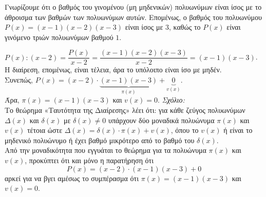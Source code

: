 \begin{alist}
\item Γνωρίζουμε ότι ο βαθμός του γινομένου (μη μηδενικών) πολυωνύμων είναι ίσος με το άθροισμα των βαθμών των πολυωνύμων αυτών. Επομένως, ο βαθμός του πολυωνύμου $P(x) = (x - 1)(x - 2)(x - 3)$ είναι ίσος με $3$, καθώς το $P(x)$ είναι γινόμενο τριών πολυωνύμων βαθμού $1$.
\item $P(x) : (x - 2) = \dfrac{P(x)}{x - 2} = \dfrac{(x - 1)(x - 2)(x - 3)}{x - 2} = (x - 1)(x - 3)$. Η διαίρεση, επομένως, είναι τέλεια, άρα το υπόλοιπο είναι ίσο με μηδέν. \\
Συνεπώς, $P(x) = (x - 2) \cdot \underbrace{(x - 1)(x - 3)}_{\pi(x)} + \underbrace{0}_{v(x)}$. \\
Άρα, $\pi(x) = (x - 1)(x - 3)$ και $v(x) = 0$.
\textit{Σχόλιο:} \\
Το θεώρημα «Ταυτότητα της Διαίρεσης» λέει ότι: για κάθε ζεύγος πολυωνύμων $\Delta(x)$ και $\delta(x)$ με $\delta(x) \neq 0$ υπάρχουν δύο μοναδικά πολυώνυμα $\pi(x)$ και $v(x)$ τέτοια ώστε $\Delta(x) = \delta(x) \cdot \pi(x) + v(x)$, όπου το $v(x)$ ή είναι το μηδενικό πολυώνυμο ή έχει βαθμό μικρότερο από το βαθμό του $\delta(x)$. \\
Από την μοναδικότητα που εγγυάται το θεώρημα για τα πολυώνυμα $\pi(x)$ και $v(x)$, προκύπτει ότι και μόνο η παρατήρηση ότι
\[P(x) = (x - 2) \cdot (x - 1)(x - 3) + 0\]
αρκεί για να βγει αμέσως το συμπέρασμα ότι $\pi(x) = (x - 1)(x - 3)$ και $v(x) = 0$.
\end{alist}


